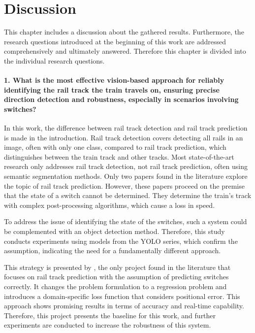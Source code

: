 \chapter{Discussion}
\label{sec:discussion}

This chapter includes a discussion about the gathered results.
Furthermore, the research questions introduced at the beginning of this work are addressed comprehensively and ultimately answered.
Therefore this chapter is divided into the individual research questions.

\subsubsection{1. What is the most effective vision-based approach for reliably identifying the rail track the train travels on, ensuring precise direction detection and robustness, especially in scenarios involving switches?}

In this work, the difference between rail track detection and rail track prediction is made in the introduction.
Rail track detection covers detecting all rails in an image, often with only one class, compared to rail track prediction, which distinguishes between the train track and other tracks.
Most state-of-the-art research only addresses rail track detection, not rail track prediction, often using semantic segmentation methods.
Only two papers found in the literature explore the topic of rail track prediction.
However, these papers proceed on the premise that the state of a switch cannot be determined.
They determine the train's track with complex post-processing algorithms, which cause a loss in speed.

To address the issue of identifying the state of the switches, such a system could be complemented with an object detection method.
Therefore, this study conducts experiments using models from the \ac{YOLO} series, which confirm the assumption, indicating the need for a fundamentally different approach.

This strategy is presented by \cite{tepNet2024}, the only project found in the literature that focuses on rail track prediction with the assumption of predicting switches correctly.
It changes the problem formulation to a regression problem and introduces a domain-specific loss function that considers positional error.
This approach shows promising results in terms of accuracy and real-time capability.
Therefore, this project presents the baseline for this work, and further experiments are conducted to increase the robustness of this system.

